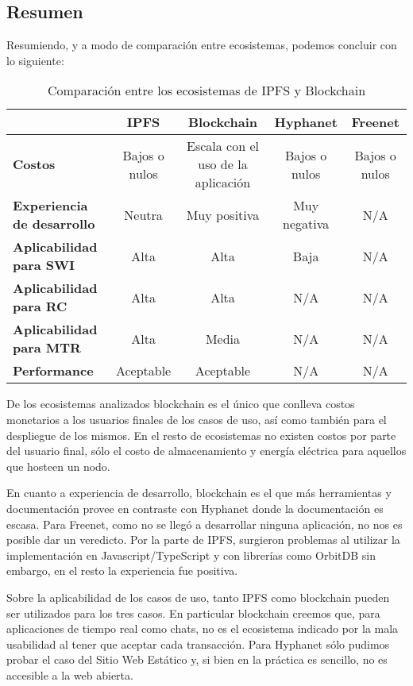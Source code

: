 \subsection{Resumen}

Resumiendo, y a modo de comparación entre ecosistemas, podemos concluir con lo siguiente:

\setlength\tabcolsep{2pt}
\begin{table}[H]
    \centering
    \begin{tabular}{|m{7em}|c|c|c|c|}
    \hline
      & \textbf{IPFS} & \textbf{Blockchain} & \textbf{Hyphanet} & \textbf{Freenet} \\
    \hline
    \textbf{Costos} & Bajos o nulos & Escala con el uso de la aplicación & Bajos o nulos & Bajos o nulos \\
    \hline
    \textbf{Experiencia de desarrollo} & Neutra & Muy positiva & Muy negativa & N/A \\
    \hline
    \textbf{Aplicabilidad para SWI} & Alta & Alta & Baja & N/A \\
    \hline
    \textbf{Aplicabilidad para RC} & Alta & Alta & N/A & N/A \\
    \hline
    \textbf{Aplicabilidad para MTR} & Alta & Media & N/A & N/A \\
    \hline
    \textbf{Performance} & Aceptable & Aceptable & N/A & N/A \\
    \hline
    \end{tabular}
    \caption{Comparación entre los ecosistemas de IPFS y Blockchain}
\end{table}

De los ecosistemas analizados blockchain es el único que conlleva costos monetarios a los usuarios finales de los casos de uso, así como también para el despliegue de los mismos. En el resto de ecosistemas no existen costos por parte del usuario final, sólo el costo de almacenamiento y energía eléctrica para aquellos que hosteen un nodo.

En cuanto a experiencia de desarrollo, blockchain es el que más herramientas y documentación provee en contraste con Hyphanet donde la documentación es escasa. Para Freenet, como no se llegó a desarrollar ninguna aplicación, no nos es posible dar un veredicto. Por la parte de IPFS, surgieron problemas al utilizar la implementación en Javascript/TypeScript y con librerías como OrbitDB sin embargo, en el resto la experiencia fue positiva.

Sobre la aplicabilidad de los casos de uso, tanto IPFS como blockchain pueden ser utilizados para los tres casos. En particular blockchain creemos que, para aplicaciones de tiempo real como chats, no es el ecosistema indicado por la mala usabilidad al tener que aceptar cada transacción. Para Hyphanet sólo pudimos probar el caso del Sitio Web Estático y, si bien en la práctica es sencillo, no es accesible a la web abierta.

